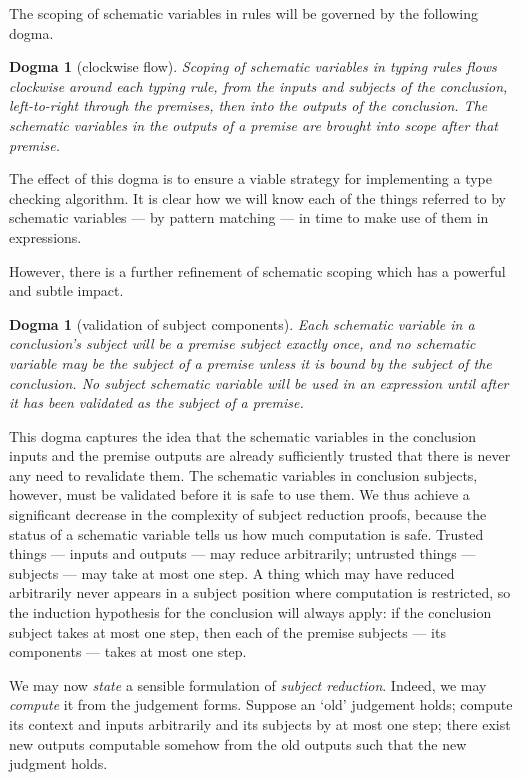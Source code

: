 \documentclass{jfp1}
\newtheorem{dogma}[theorem]{Dogma}
\begin{document}
The scoping of schematic variables in rules will be governed by the
following dogma.

\begin{dogma}[clockwise flow\label{dogma:clockwise}]
  Scoping of schematic variables in typing rules flows clockwise
  around each typing rule, from the inputs and subjects of the
  conclusion, left-to-right through the premises, then into the
  outputs of the conclusion. The schematic variables in the outputs
  of a premise are brought into scope after that premise.
\end{dogma}

The effect of this dogma is to ensure a viable strategy for
implementing a type checking algorithm. It is clear how we will know
each of the things referred to by schematic variables --- by pattern
matching --- in time to make use of them in expressions.

However, there is a further refinement of schematic scoping which has
a powerful and subtle impact.

\begin{dogma}[validation of subject components\label{dogma:subject}]
  Each schematic variable in a conclusion's subject will be a premise
  subject exactly once, and no schematic variable may be the
  subject of a premise unless it is bound by the subject of the
  conclusion. No subject schematic variable will be used in an
  expression until after it has been validated as the subject of
  a premise.
\end{dogma}

This dogma captures the idea that the schematic variables in the
conclusion inputs and the premise outputs are already sufficiently
trusted that there is never any need to revalidate them. The schematic
variables in conclusion subjects, however, must be validated before it
is safe to use them. We thus achieve a significant decrease in the
complexity of subject reduction proofs, because the status of a
schematic variable tells us how much computation is safe. Trusted
things --- inputs and outputs --- may reduce arbitrarily; untrusted
things --- subjects --- may take at most one step. A thing which may
have reduced arbitrarily never appears in a subject position where
computation is restricted, so the induction hypothesis for the
conclusion will always apply: if the conclusion subject takes at most one step,
then each of the premise subjects --- its components --- takes at most
one step.

We may now \emph{state} a sensible formulation of \emph{subject
  reduction}. Indeed, we may \emph{compute} it from the judgement
forms. Suppose an `old' judgement holds; compute its context and inputs
arbitrarily and its subjects by at most one step; there exist new
outputs computable somehow from the old outputs such that the new
judgment holds.
\end{document}
